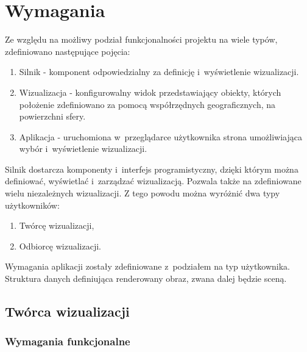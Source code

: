 \chapter{Wymagania}

Ze względu na możliwy podział funkcjonalności projektu na wiele typów, zdefiniowano następujące pojęcia:
\begin{enumerate}
    \item Silnik - komponent odpowiedzialny za definicję i~wyświetlenie wizualizacji.
    \item Wizualizacja - konfigurowalny widok przedstawiający obiekty, których położenie zdefiniowano za pomocą współrzędnych geograficznych, na powierzchni sfery.
    \item Aplikacja - uruchomiona w~przeglądarce użytkownika strona umożliwiająca wybór i~wyświetlenie wizualizacji.
\end{enumerate} 

Silnik dostarcza komponenty i~interfejs programistyczny, dzięki którym można definiować, wyświetlać i~zarządzać wizualizacją.
Pozwala także na zdefiniowane wielu niezależnych wizualizacji. Z tego powodu można wyróżnić dwa typy użytkowników:

\begin{enumerate}
    \item Twórcę wizualizacji,
    \item Odbiorcę wizualizacji.
\end{enumerate}

Wymagania aplikacji zostały zdefiniowane z~podziałem na typ użytkownika.
Struktura danych definiująca renderowany obraz, zwana dalej będzie sceną.

\newcommand{\req}[3]{
    \stepcounter{#2}
    #1\_\arabic{#2} & #3 \\
    \hline
}

\section{Twórca wizualizacji}

\subsection{Wymagania funkcjonalne}


